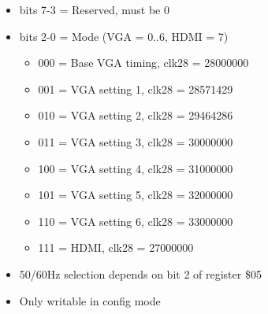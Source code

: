 \begin{itemize}
\item bits 7-3 = Reserved, must be 0
\item bits 2-0 = Mode (VGA = 0..6, HDMI = 7)
  \begin{itemize}
  \item 000 = Base VGA timing, clk28 = 28000000
  \item 001 = VGA setting 1, clk28 = 28571429
  \item 010 = VGA setting 2, clk28 = 29464286
  \item 011 = VGA setting 3, clk28 = 30000000
  \item 100 = VGA setting 4, clk28 = 31000000
  \item 101 = VGA setting 5, clk28 = 32000000
  \item 110 = VGA setting 6, clk28 = 33000000
  \item 111 = HDMI, clk28 = 27000000
  \end{itemize}
\item[] 50/60Hz selection depends on bit 2 of register \$05
\item[] Only writable in config mode
\end{itemize}

